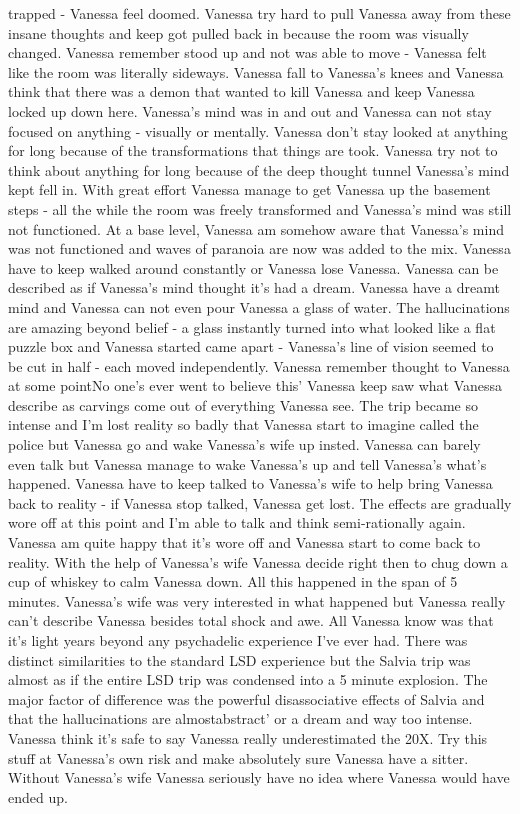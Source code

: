 \documentclass[12pt]{book}
\begin{document}
trapped - Vanessa feel doomed. Vanessa try hard to pull Vanessa away from these insane thoughts and keep got pulled back in because the room was visually changed. Vanessa remember stood up and not was able to move - Vanessa felt like the room was literally sideways. Vanessa fall to Vanessa's knees and Vanessa think that there was a demon that wanted to kill Vanessa and keep Vanessa locked up down here. Vanessa's mind was in and out and Vanessa can not stay focused on anything - visually or mentally. Vanessa don't stay looked at anything for long because of the transformations that things are took. Vanessa try not to think about anything for long because of the deep thought tunnel Vanessa's mind kept fell in. With great effort Vanessa manage to get Vanessa up the basement steps - all the while the room was freely transformed and Vanessa's mind was still not functioned. At a base level, Vanessa am somehow aware that Vanessa's mind was not functioned and waves of paranoia are now was added to the mix. Vanessa have to keep walked around constantly or Vanessa lose Vanessa. Vanessa can be described as if Vanessa's mind thought it's had a dream. Vanessa have a dreamt mind and Vanessa can not even pour Vanessa a glass of water. The hallucinations are amazing beyond belief - a glass instantly turned into what looked like a flat puzzle box and Vanessa started came apart - Vanessa's line of vision seemed to be cut in half - each moved independently. Vanessa remember thought to Vanessa at some pointNo one's ever went to believe this' Vanessa keep saw what Vanessa describe as carvings come out of everything Vanessa see. The trip became so intense and I'm lost reality so badly that Vanessa start to imagine called the police but Vanessa go and wake Vanessa's wife up insted. Vanessa can barely even talk but Vanessa manage to wake Vanessa's up and tell Vanessa's what's happened. Vanessa have to keep talked to Vanessa's wife to help bring Vanessa back to reality - if Vanessa stop talked, Vanessa get lost. The effects are gradually wore off at this point and I'm able to talk and think semi-rationally again. Vanessa am quite happy that it's wore off and Vanessa start to come back to reality. With the help of Vanessa's wife Vanessa decide right then to chug down a cup of whiskey to calm Vanessa down. All this happened in the span of 5 minutes. Vanessa's wife was very interested in what happened but Vanessa really can't describe Vanessa besides total shock and awe. All Vanessa know was that it's light years beyond any psychadelic experience I've ever had. There was distinct similarities to the standard LSD experience but the Salvia trip was almost as if the entire LSD trip was condensed into a 5 minute explosion. The major factor of difference was the powerful disassociative effects of Salvia and that the hallucinations are almostabstract' or a dream and way too intense. Vanessa think it's safe to say Vanessa really underestimated the 20X. Try this stuff at Vanessa's own risk and make absolutely sure Vanessa have a sitter. Without Vanessa's wife Vanessa seriously have no idea where Vanessa would have ended up.
\end{document}
